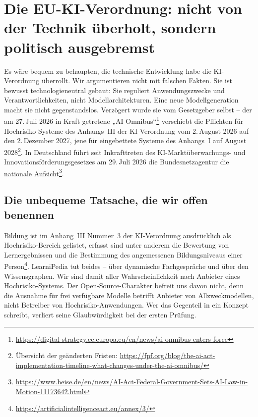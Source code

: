\documentclass[11pt,a4paper]{article}
\begin{document}
\section{Die EU-KI-Verordnung: nicht von der Technik überholt, sondern politisch ausgebremst}
\label{sec:kiact}
Es wäre bequem zu behaupten, die technische Entwicklung habe die KI-Verordnung überrollt. Wir argumentieren nicht mit falschen Fakten. Sie ist bewusst technologieneutral gebaut: Sie reguliert Anwendungszwecke und Verantwortlichkeiten, nicht Modellarchitekturen. Eine neue Modellgeneration macht sie nicht gegenstandslos. Verzögert wurde sie vom Gesetzgeber selbst -- der am 27.\,Juli 2026 in Kraft getretene „AI Omnibus“\footnote{\url{https://digital-strategy.ec.europa.eu/en/news/ai-omnibus-enters-force}} verschiebt die Pflichten für Hochrisiko-Systeme des Anhangs~III der KI-Verordnung vom 2.\,August 2026 auf den 2.\,Dezember 2027, jene für eingebettete Systeme des Anhangs~I auf August 2028\footnote{Übersicht der geänderten Fristen: \url{https://fpf.org/blog/the-ai-act-implementation-timeline-what-changes-under-the-ai-omnibus/}}. In Deutschland führt seit Inkrafttreten des KI-Marktüberwachungs- und Innovationsförderungsgesetzes am 29.\,Juli 2026 die Bundesnetzagentur die nationale Aufsicht\footnote{\url{https://www.heise.de/en/news/AI-Act-Federal-Government-Sets-AI-Law-in-Motion-11173642.html}}.

\subsection{Die unbequeme Tatsache, die wir offen benennen}
Bildung ist im Anhang~III Nummer~3 der KI-Verordnung ausdrücklich als Hochrisiko-Bereich gelistet, erfasst sind unter anderem die Bewertung von Lernergebnissen und die Bestimmung des angemessenen Bildungsniveaus einer Person\footnote{\url{https://artificialintelligenceact.eu/annex/3/}}. LearniPedia tut beides -- über dynamische Fachgespräche und über den Wissensgraphen. Wir sind damit aller Wahrscheinlichkeit nach Anbieter eines Hochrisiko-Systems. Der Open-Source-Charakter befreit uns davon nicht, denn die Ausnahme für frei verfügbare Modelle betrifft Anbieter von Allzweckmodellen, nicht Betreiber von Hochrisiko-Anwendungen. Wer das Gegenteil in ein Konzept schreibt, verliert seine Glaubwürdigkeit bei der ersten Prüfung.
\end{document}
